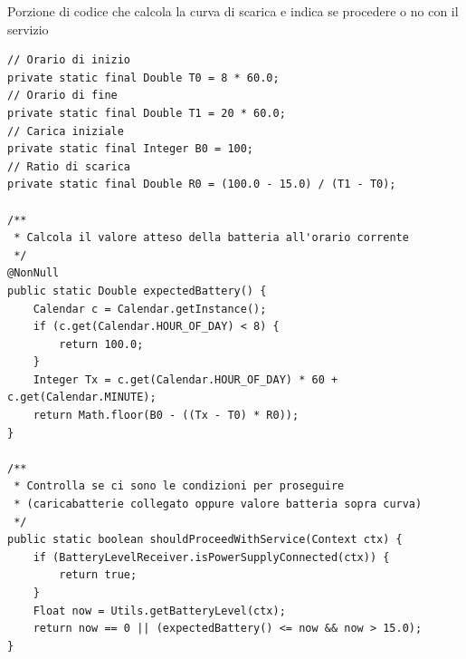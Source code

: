 \documentclass[a4paper,10pt]{memoir}
\begin{document}
\begin{figure}[ht]

\end{figure}

\clearpage

\begin{listing}[H]
\caption{Porzione di codice che calcola la curva di scarica e indica se procedere o no con il servizio}
\begin{verbatim}
// Orario di inizio
private static final Double T0 = 8 * 60.0;
// Orario di fine
private static final Double T1 = 20 * 60.0;
// Carica iniziale
private static final Integer B0 = 100;
// Ratio di scarica
private static final Double R0 = (100.0 - 15.0) / (T1 - T0);

/**
 * Calcola il valore atteso della batteria all'orario corrente
 */
@NonNull
public static Double expectedBattery() {
	Calendar c = Calendar.getInstance();
	if (c.get(Calendar.HOUR_OF_DAY) < 8) {
		return 100.0;
	}
	Integer Tx = c.get(Calendar.HOUR_OF_DAY) * 60 + c.get(Calendar.MINUTE);
	return Math.floor(B0 - ((Tx - T0) * R0));
}

/**
 * Controlla se ci sono le condizioni per proseguire
 * (caricabatterie collegato oppure valore batteria sopra curva)
 */
public static boolean shouldProceedWithService(Context ctx) {
	if (BatteryLevelReceiver.isPowerSupplyConnected(ctx)) {
		return true;
	}
	Float now = Utils.getBatteryLevel(ctx);
	return now == 0 || (expectedBattery() <= now && now > 15.0);
}
\end{verbatim}
\end{listing}
\end{document}
